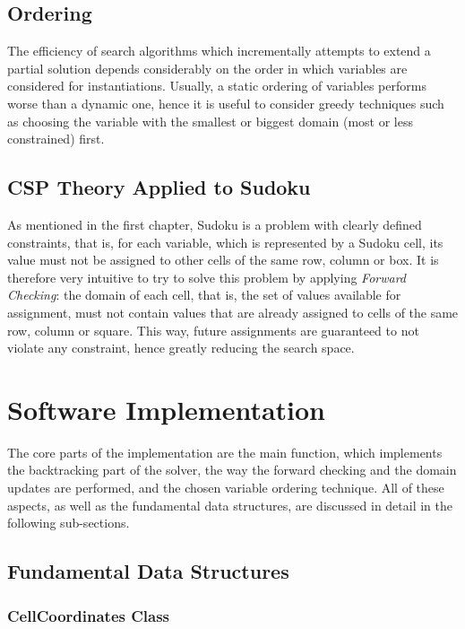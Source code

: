 \subsection{Ordering}

The efficiency of search algorithms which incrementally attempts to extend a partial solution depends considerably on the order in which variables are considered for instantiations. 
Usually, a static ordering of variables performs worse than a dynamic one, hence it is useful to consider greedy techniques such as choosing the variable with the smallest or biggest domain (most or less constrained) first.

\subsection{CSP Theory Applied to Sudoku}

As mentioned in the first chapter, Sudoku is a problem with clearly defined constraints, that is, for each variable, which is represented by a Sudoku cell, its value must not be assigned to other cells of the same row, column or box. It is therefore very intuitive to try to solve this problem by applying \textit{Forward Checking}: the domain of each cell, that is, the set of values available for assignment, must not contain values that are already assigned to cells of the same row, column or square. This way, future assignments are guaranteed to not violate any constraint, hence greatly reducing the search space.

\section{Software Implementation}

The core parts of the implementation are the main function, which implements the backtracking part of the solver, the way the forward checking and the domain updates are performed, and the chosen variable ordering technique. All of these aspects, as well as the fundamental data structures, are discussed in detail in the following sub-sections.

\subsection{Fundamental Data Structures}\label{cp_data_structs}

\subsubsection{CellCoordinates Class}

